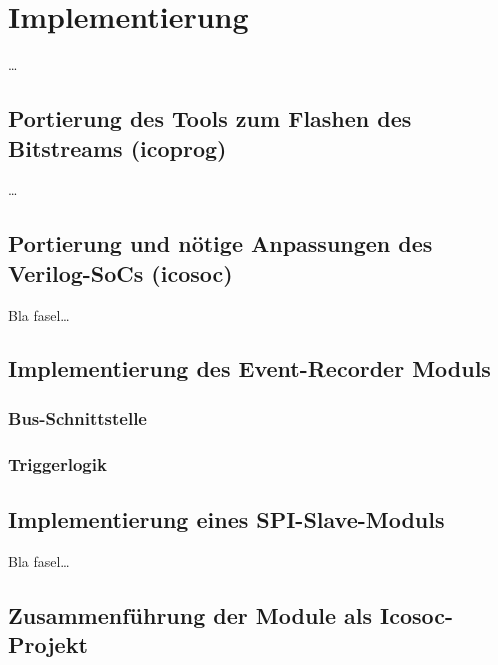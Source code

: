 \chapter{Implementierung}
\label{ch:Implementierung}

\ldots

\section{Portierung des Tools zum Flashen des Bitstreams (icoprog)}
\label{ch:Implementierung:sec:icoprog}

\ldots

\section{Portierung und n\"otige Anpassungen des Verilog-SoCs (icosoc)}
\label{ch:Implementierung:sec:icosoc}

Bla fasel\ldots


\section{Implementierung des Event-Recorder Moduls}
\label{ch:Implementierung:sec:Event-Recorder}


\subsection{Bus-Schnittstelle}


\subsection{Triggerlogik}

\section{Implementierung eines SPI-Slave-Moduls}
\label{ch:Implementierung:sec:SPI-Slave}

Bla fasel\ldots
\section{Zusammenf\"uhrung der Module als Icosoc-Projekt}
\label{ch:Implementierung:sec:Icosoc-Projekt}


